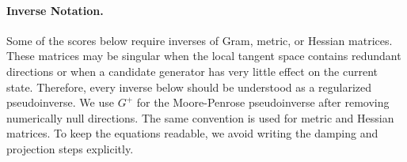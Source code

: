 \documentclass[
  reprint,
  amsmath,
  amssymb,
  aps,
  pra,
  nofootinbib,
  superscriptaddress,
  floatfix
]{revtex4-2}
\begin{document}
\paragraph*{Inverse Notation.}
Some of the scores below require inverses of Gram, metric, or Hessian matrices. These matrices may be singular when the local tangent space contains redundant directions or when a candidate generator has very little effect on the current state. Therefore, every inverse below should be understood as a regularized pseudoinverse. We use \(G^+\) for the Moore-Penrose pseudoinverse after removing numerically null directions. The same convention is used for metric and Hessian matrices. To keep the equations readable, we avoid writing the damping and projection steps explicitly.
\end{document}
